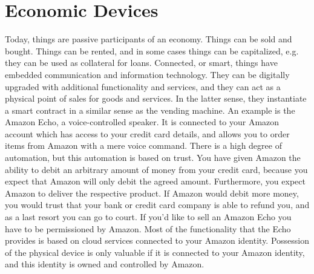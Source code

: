 
\section{Economic Devices}

Today, things are passive participants of an economy. Things can be sold and bought. Things can be rented, and in some cases things can be capitalized, e.g. they can be used as collateral for loans. Connected, or smart, things have embedded communication and information technology. They can be digitally upgraded with additional functionality and services, and they can act as a physical point of sales for goods and services. In the latter sense, they instantiate a smart contract in a similar sense as the vending machine. An example is the Amazon Echo, a voice-controlled speaker. It is connected to your Amazon account which has access to your credit card details, and allows you to order items from Amazon with a mere voice command. There is a high degree of automation, but this automation is based on trust. You have given Amazon the ability to debit an arbitrary amount of money from your credit card, because you expect that Amazon will only debit the agreed amount. Furthermore, you expect Amazon to deliver the respective product. If Amazon would debit more money, you would trust that your bank or credit card company is able to refund you, and as a last resort you can go to court. If you'd like to sell an Amazon Echo you have to be permissioned by Amazon. Most of the functionality that the Echo provides is based on cloud services connected to your Amazon identity. Possession of the physical device is only valuable if it is connected to your Amazon identity, and this identity is owned and controlled by Amazon.


